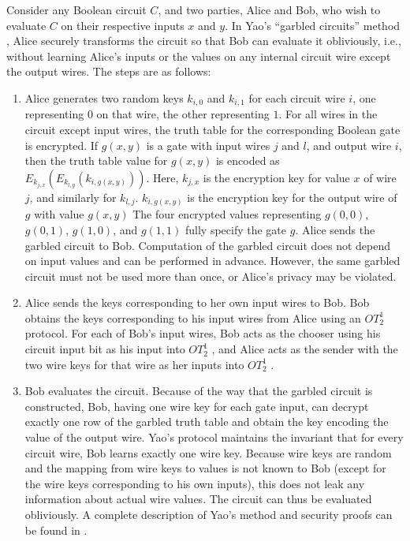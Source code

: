 Consider any Boolean circuit $C$, and two parties, Alice and Bob,
who wish to evaluate $C$ on their respective inputs $x$ and $y$.
In Yao's {}``garbled circuits'' method \cite{Yao86}, Alice securely
transforms the circuit so that Bob can evaluate it obliviously, i.e.,
without learning Alice's inputs or the values on any internal circuit
wire except the output wires. The steps are as follows:
\begin{enumerate}
\item Alice generates two random keys $k_{i,0}$ and $k_{i,1}$ for each
circuit wire $i$, one representing $0$ on that wire, the other representing
$1$. For all wires in the circuit except input wires, the truth table
for the corresponding Boolean gate is encrypted. If $g(x,y)$ is a
gate with input wires $j$ and $l$, and output wire $i$, then the
truth table value for $g(x,y)$ is encoded as $E_{k_{j,x}}\left(E_{k_{l,y}}\left(k_{i,g(x,y)}\right)\right)$.
Here, $k_{j,x}$ is the encryption key for value $x$ of wire $j$,
and similarly for $k_{l,j}$. $k_{i,g(x,y)}$ is the encryption key
for the output wire of $g$ with value $g(x,y)$ The four encrypted
values representing $g(0,0)$, $g(0,1)$, $g(1,0)$, and $g(1,1)$
fully specify the gate $g$. Alice sends the garbled circuit to Bob.
Computation of the garbled circuit does not depend on input values
and can be performed in advance. However, the same garbled circuit
must not be used more than once, or Alice's privacy may be violated.
\item Alice sends the keys corresponding to her own input wires to Bob.
Bob obtains the keys corresponding to his input wires from Alice using
an $OT_{2}^{1}$ protocol. For each of Bob's input wires, Bob acts
as the chooser using his circuit input bit as his input into $OT_{2}^{1}$
, and Alice acts as the sender with the two wire keys for that wire
as her inputs into $OT_{2}^{1}$ .
\item Bob evaluates the circuit. Because of the way that the garbled circuit
is constructed, Bob, having one wire key for each gate input, can
decrypt exactly one row of the garbled truth table and obtain the
key encoding the value of the output wire. Yao's protocol maintains
the invariant that for every circuit wire, Bob learns exactly one
wire key. Because wire keys are random and the mapping from wire keys
to values is not known to Bob (except for the wire keys corresponding
to his own inputs), this does not leak any information about actual
wire values. The circuit can thus be evaluated obliviously. A complete
description of Yao's method and security proofs can be found in \cite{Goldreich:vol2}.
\end{enumerate}


